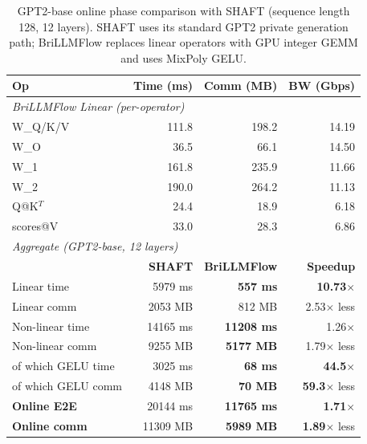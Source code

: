 \begin{table}[t]
\centering
\caption{GPT2-base online phase comparison with SHAFT (sequence length 128, 12 layers). SHAFT uses its standard GPT2 private generation path; BriLLMFlow replaces linear operators with GPU integer GEMM and uses MixPoly GELU.}
\label{tab:gpt2_shaft_comparison}
\setlength{\tabcolsep}{4pt}
\footnotesize
\begin{tabular}{lrrr}
\toprule
\textbf{Op} & \textbf{Time (ms)} & \textbf{Comm (MB)} & \textbf{BW (Gbps)} \\
\midrule
\multicolumn{4}{l}{\textit{BriLLMFlow Linear (per-operator)}} \\
W\_Q/K/V    & 111.8 & 198.2 & 14.19 \\
W\_O        & 36.5 & 66.1 & 14.50 \\
W\_1        & 161.8 & 235.9 & 11.66 \\
W\_2        & 190.0 & 264.2 & 11.13 \\
Q@K$^T$     & 24.4 & 18.9 & 6.18 \\
scores@V    & 33.0 & 28.3 & 6.86 \\
\midrule
\multicolumn{4}{l}{\textit{Aggregate (GPT2-base, 12 layers)}} \\
                       & \textbf{SHAFT} & \textbf{BriLLMFlow} & \textbf{Speedup} \\
Linear time            & 5979 ms & \textbf{557 ms} & \textbf{10.73}$\times$ \\
Linear comm            & 2053 MB & 812 MB & 2.53$\times$ less \\
Non-linear time        & 14165 ms & \textbf{11208 ms} & 1.26$\times$ \\
Non-linear comm        & 9255 MB & \textbf{5177 MB} & 1.79$\times$ less \\
\quad of which GELU time & 3025 ms & \textbf{68 ms} & \textbf{44.5}$\times$ \\
\quad of which GELU comm & 4148 MB & \textbf{70 MB} & \textbf{59.3}$\times$ less \\
\midrule
\textbf{Online E2E}    & 20144 ms & \textbf{11765 ms} & \textbf{1.71}$\times$ \\
\textbf{Online comm}   & 11309 MB & \textbf{5989 MB} & \textbf{1.89}$\times$ less \\
\bottomrule
\end{tabular}
\end{table}
